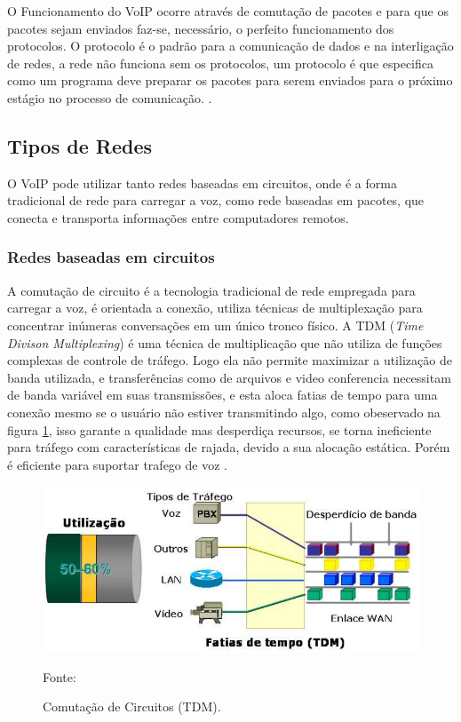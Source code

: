 O Funcionamento do VoIP ocorre através de comutação de pacotes e para que os pacotes sejam enviados faz-se, necessário, o perfeito funcionamento dos protocolos. O protocolo é o padrão para a comunicação de dados e na interligação de redes, a rede não funciona sem os protocolos, um protocolo é que especifica como um programa deve preparar os pacotes para serem enviados para o próximo estágio no processo de comunicação. \cite{andersonramires2005}.

\subsection{Tipos de Redes}
O VoIP pode utilizar tanto redes baseadas em circuitos, onde é a forma  tradicional de rede para carregar a voz, como rede baseadas em pacotes, que conecta e transporta informações entre computadores remotos.

\subsubsection{Redes baseadas em circuitos}
A comutação de circuito é a tecnologia tradicional de rede empregada para carregar a voz, é orientada a conexão, utiliza técnicas de multiplexação para concentrar inúmeras conversações em um único tronco físico. A TDM (\textit{Time Divison Multiplexing}) é uma técnica de multiplicação que não utiliza de funções complexas de controle de tráfego. Logo ela não permite maximizar a utilização de banda utilizada, e transferências como de arquivos e video conferencia necessitam de banda variável em suas transmissões, e esta aloca fatias de tempo para uma conexão mesmo se o usuário não estiver transmitindo algo, como obeservado na figura \ref{Figura7}, isso garante a qualidade mas desperdiça recursos, se torna ineficiente para tráfego com características de rajada, devido a sua alocação estática. Porém é eficiente
para suportar trafego de voz \cite{thiagowinkler2007}.

\begin{figure}[h]
	\centering
	\includegraphics[width=16.0cm]{imagens/comutacaoCircuitosTDM.jpg}
	\caption{Comutação de Circuitos (TDM).}
    \label{Figura7}
    Fonte: \cite{eduardomaronasmonks2006}
\end{figure}

